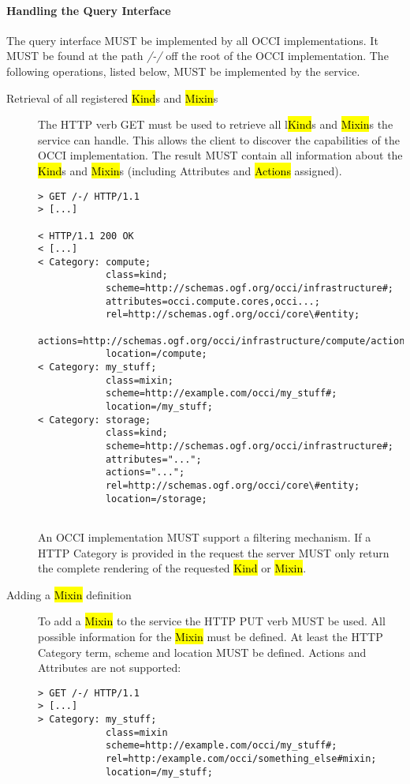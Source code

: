 \documentclass[10pt,a4paper]{article}
\begin{document}
\paragraph{Handling the Query Interface}
\label{sec:query}
The query interface MUST be implemented by all OCCI
implementations. It MUST be found at the path \emph{/-/} off the root
of the OCCI implementation. The following operations, listed below,
MUST be implemented by the service.

\begin{description}
\item[Retrieval of all registered \hl{Kind}s and \hl{Mixin}s] The HTTP
  verb GET must be used to retrieve all l\hl{Kind}s and \hl{Mixin}s the
  service can handle. This allows the client to discover the
  capabilities of the OCCI implementation. The result MUST contain all
  information about the \hl{Kind}s and \hl{Mixin}s (including
  Attributes and \hl{Actions} assigned).
\begin{verbatim}
> GET /-/ HTTP/1.1
> [...]
 
< HTTP/1.1 200 OK
< [...]
< Category: compute;
            class=kind;
            scheme=http://schemas.ogf.org/occi/infrastructure#;
            attributes=occi.compute.cores,occi...;
            rel=http://schemas.ogf.org/occi/core\#entity;
            actions=http://schemas.ogf.org/occi/infrastructure/compute/action#stop,...;
            location=/compute;
< Category: my_stuff;
            class=mixin;
            scheme=http://example.com/occi/my_stuff#;
            location=/my_stuff;
< Category: storage; 
            class=kind;
            scheme=http://schemas.ogf.org/occi/infrastructure#;
            attributes="...";
            actions="...";
            rel=http://schemas.ogf.org/occi/core\#entity;
            location=/storage;
 
\end{verbatim}
An OCCI implementation MUST support a filtering mechanism. If a HTTP
Category is provided in the request the server MUST only return the
complete rendering of the requested \hl{Kind} or \hl{Mixin}.

\item[Adding a \hl{Mixin} definition] To add a \hl{Mixin} to
  the service the HTTP PUT verb MUST be used. All possible information
  for the \hl{Mixin} must be defined. At least the HTTP Category term,
  scheme and location MUST be defined. Actions and Attributes are not
  supported:
\begin{verbatim}
> GET /-/ HTTP/1.1
> [...]
> Category: my_stuff;
            class=mixin
            scheme=http://example.com/occi/my_stuff#;
            rel=http:/example.com/occi/something_else#mixin;
            location=/my_stuff;


\end{verbatim}
\end{description}
\end{document}
